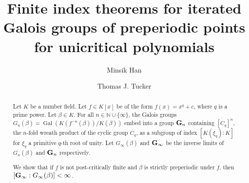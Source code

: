 \documentclass[11pt]{amsart}
\theoremstyle{definition}
\theoremstyle{definition}
\numberwithin{thm}{section}
\numberwithin{equation}{thm}
\newcommand{\bP}{\ensuremath{{\mathbb{P}}}}
\DeclareMathOperator{\Gal}{Gal}
\begin{document}
\title[Iterated Galois groups of unicritical polynomials]{Finite index
  theorems for iterated Galois groups of preperiodic points
for unicritical polynomials}



\author[Minsik Han]{Minsik Han}
\address{Minsik Han\\Department of Mathematics\\ University of Rochester\\
Rochester, NY, 14620, USA}



\author[T. J. Tucker]{Thomas J. Tucker}
\address{Thomas J. Tucker\\Department of Mathematics\\ University of Rochester\\
Rochester, NY, 14620, USA}



\date{}

\dedicatory{}

\begin{abstract}
  Let $K$ be a number field. Let $f\in K[x]$ be of the form
  $f(x)=x^q+c$, where $q$ is a prime power.  Let $\beta\in K$. For
  all $n\in\mathbb{N}\cup\{\infty\}$, the Galois groups
  $G_n(\beta)=\Gal(K(f^{-n}(\beta))/K(\beta))$ embed into a group
  ${\bf G}_n$ containing  $[C_q]^n$, the $n$-fold
  wreath product of the cyclic group $C_q$, as a subgroup of index
  $[K(\xi_q): K]$ for $\xi_q$ a primitive $q$-th root of unity.  Let
  $G_\infty(\beta)$ and ${\bf G}_\infty $ be the inverse limits of
  $G_n (\beta)$ and ${\bf G}_n$ respectively.  

  We show that if
  $f$ is not post-critically finite and
  $\beta$ is strictly preperiodic under
  $f$, then $[{\bf G}_\infty:G_\infty(\beta)]<\infty$.
\end{abstract}
\end{document}

